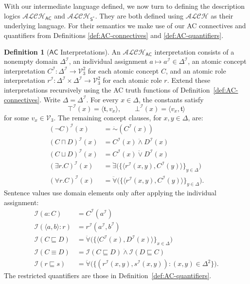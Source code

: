 \documentclass[letterpaper]{article} %
\theoremstyle{definition}
\theoremstyle{definition}
\newtheorem{definition}{Definition}
\theoremstyle{definition}
\theoremstyle{definition}
\theoremstyle{definition}
\newcommand{\strongneg}{\mathord{\sim}}
\newcommand{\isa}{\mathbin{{:}}}
\newcommand{\vt}{\mathfrak{t}}
\begin{document}
With our intermediate language defined, we now turn to defining the description logics $\mathcal{ALCH}_\mathsf{AC}$ and $\mathcal{ALCH}_{\mathsf{S}^*}$. They are both defined using $\mathcal{ALCH}$ as their underlying language. For their semantics we make use of our AC connectives and quantifiers from Definitions \ref{def:AC-connectives} and \ref{def:AC-quantifiers}.

\begin{definition}[$\mathsf{AC}$ Interpretations]\label{def:Bilateral-Interp}
An $\mathcal{ALCH}_\mathsf{AC}$ interpretation consists of a nonempty domain $\Delta^{\mathcal{I}}$, an individual assignment $a\mapsto a^{\mathcal{I}}\in\Delta^{\mathcal{I}}$, an atomic concept interpretation $C^{\mathcal{I}}:\Delta^{\mathcal{I}}\to\mathcal{V}_{3}^{2}$ for each atomic concept $C$, and an atomic role interpretation $r^{\mathcal{I}}:\Delta^{\mathcal{I}}\times\Delta^{\mathcal{I}}\to\mathcal{V}_{3}^{2}$ for each atomic role $r$. Extend these interpretations recursively using the AC truth functions of Definition~\ref{def:AC-connectives}. Write $\Delta=\Delta^{\mathcal{I}}$. For every $x\in\Delta$, the constants satisfy
\[
\top^{\mathcal{I}}(x)=\langle\vt,v_x\rangle,\qquad
\bot^{\mathcal{I}}(x)=\langle v_x,\vt\rangle
\]
for some $v_x\in\mathcal{V}_{3}$. The remaining concept clauses, for $x,y\in\Delta$, are:
\begin{align*}
(\neg C)^{\mathcal{I}}(x)&=\ddot{\strongneg}(C^{\mathcal{I}}(x))\\
(C\sqcap D)^{\mathcal{I}}(x)&=C^{\mathcal{I}}(x)\mathrel{\ddot{\wedge}}D^{\mathcal{I}}(x)\\
(C\sqcup D)^{\mathcal{I}}(x)&=C^{\mathcal{I}}(x)\mathrel{\ddot{\vee}}D^{\mathcal{I}}(x)\\
(\exists r.C)^{\mathcal{I}}(x)&=\ddot{\exists}\bigl(\{\langle r^{\mathcal{I}}(x,y),C^{\mathcal{I}}(y)\rangle\}_{y\in\Delta}\bigr)\\
(\forall r.C)^{\mathcal{I}}(x)&=\ddot{\forall}\bigl(\{\langle r^{\mathcal{I}}(x,y),C^{\mathcal{I}}(y)\rangle\}_{y\in\Delta}\bigr).
\end{align*}
Sentence values use domain elements only after applying the individual assignment:
\begin{align*}
\mathcal{I}(a\isa C)&=C^{\mathcal{I}}(a^{\mathcal{I}})\\
\mathcal{I}(\langle a,b\rangle\isa r)&=r^{\mathcal{I}}(a^{\mathcal{I}},b^{\mathcal{I}})\\
\mathcal{I}(C\sqsubseteq D)&=\ddot{\forall}\bigl(\{\langle C^{\mathcal{I}}(x),D^{\mathcal{I}}(x)\rangle\}_{x\in\Delta}\bigr)\\
\mathcal{I}(C\equiv D)&=\mathcal{I}(C\sqsubseteq D)\mathrel{\ddot{\wedge}}\mathcal{I}(D\sqsubseteq C)\\
\mathcal{I}(r\sqsubseteq s)&=\ddot{\forall}\bigl(\{(r^{\mathcal{I}}(x,y),s^{\mathcal{I}}(x,y)):(x,y)\in\Delta^2\}\bigr).
\end{align*}
The restricted quantifiers are those in Definition~\ref{def:AC-quantifiers}.
\end{definition}
\end{document}
